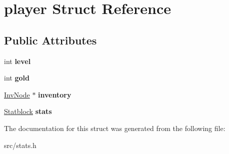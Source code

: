 \hypertarget{structplayer}{}\section{player Struct Reference}
\label{structplayer}
\subsection*{Public Attributes}
\begin{DoxyCompactItemize}
\item 
\mbox{\label{structplayer_a9b6e01bd4eaa3f7a03330320a231be6e}} 
int {\bfseries level}
\item 
\mbox{\label{structplayer_a7bab62e3706f2521605d9989d4e0e7b9}} 
int {\bfseries gold}
\item 
\mbox{\label{structplayer_ac736b7f31a011945f912c0aa19c3da55}} 
\mbox{\hyperlink{structinvNode}{Inv\+Node}} $\ast$ {\bfseries inventory}
\item 
\mbox{\label{structplayer_a078bfde07c0e4fe4405272858817638d}} 
\mbox{\hyperlink{structstatblock}{Statblock}} {\bfseries stats}
\end{DoxyCompactItemize}


The documentation for this struct was generated from the following file\+:\begin{DoxyCompactItemize}
\item 
src/stats.\+h\end{DoxyCompactItemize}

